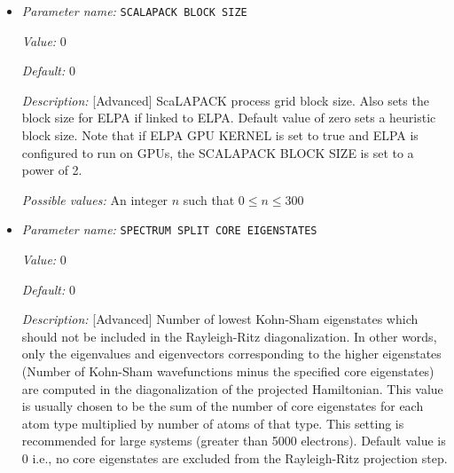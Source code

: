 \begin{itemize}
{\it Default:} 0


{\it Description:} [Advanced] Uses a processor grid of SCALAPACKPROCS times SCALAPACKPROCS for parallel distribution of the subspace projected matrix in the Rayleigh-Ritz step and the overlap matrix in the Cholesky-Gram-Schmidt step. Default value is 0 for which a thumb rule is used (see http://netlib.org/scalapack/slug/node106.html). If ELPA is used, twice the value obtained from the thumb rule is used as ELPA scales much better than ScaLAPACK.


{\it Possible values:} An integer $n$ such that $0\leq n \leq 300$
\item {\it Parameter name:} {\tt SCALAPACK BLOCK SIZE}
\label{parameters:SCF parameters/Eigen_2dsolver parameters/SCALAPACK BLOCK SIZE}
\label{parameters:SCF_20parameters/Eigen_2dsolver_20parameters/SCALAPACK_20BLOCK_20SIZE}


{\it Value:} 0


{\it Default:} 0


{\it Description:} [Advanced] ScaLAPACK process grid block size. Also sets the block size for ELPA if linked to ELPA. Default value of zero sets a heuristic block size. Note that if ELPA GPU KERNEL is set to true and ELPA is configured to run on GPUs, the SCALAPACK BLOCK SIZE is set to a power of 2.


{\it Possible values:} An integer $n$ such that $0\leq n \leq 300$
\item {\it Parameter name:} {\tt SPECTRUM SPLIT CORE EIGENSTATES}
\label{parameters:SCF parameters/Eigen_2dsolver parameters/SPECTRUM SPLIT CORE EIGENSTATES}
\label{parameters:SCF_20parameters/Eigen_2dsolver_20parameters/SPECTRUM_20SPLIT_20CORE_20EIGENSTATES}


{\it Value:} 0


{\it Default:} 0


{\it Description:} [Advanced] Number of lowest Kohn-Sham eigenstates which should not be included in the Rayleigh-Ritz diagonalization.  In other words, only the eigenvalues and eigenvectors corresponding to the higher eigenstates (Number of Kohn-Sham wavefunctions minus the specified core eigenstates) are computed in the diagonalization of the projected Hamiltonian. This value is usually chosen to be the sum of the number of core eigenstates for each atom type multiplied by number of atoms of that type. This setting is recommended for large systems (greater than 5000 electrons). Default value is 0 i.e., no core eigenstates are excluded from the Rayleigh-Ritz projection step.



\end{itemize}
